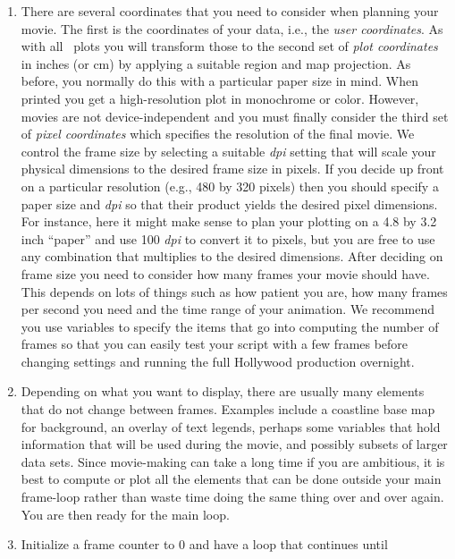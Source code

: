 \let\oldenumi\labelenumi
\renewcommand{\labelenumi}{\textbf{\arabic{enumi}.}}
\begin{enumerate}
\item There are several coordinates that you need to consider when planning
your movie.  The first is the coordinates of your data, i.e., the \emph{user
coordinates}.  As with all \GMT\ plots you will transform those to the
second set of \emph{plot coordinates} 
in inches (or cm) by applying a suitable region and map projection.  As
before, you normally do this with a particular paper size in mind.  When
printed you get a high-resolution plot in monochrome or color.
However, movies are not device-independent and you must finally consider
the third set of \emph{pixel coordinates} which specifies the resolution of the final movie.
We control the frame size by selecting a suitable \emph{dpi} setting that
will scale your physical dimensions to the desired frame size in pixels.
If you decide up front on a particular resolution (e.g., 480 by 320 pixels)
then you should specify a paper size and \emph{dpi} so that their product yields the desired pixel dimensions.
For instance, here it might make sense to plan your plotting on a 4.8 by 3.2 inch ``paper''
and use 100 \emph{dpi} to convert it to pixels, but you are free to use any combination
that multiplies to the desired dimensions.  After deciding on frame size you need
to consider how many frames your movie should have.  This depends on lots of things
such as how patient you are, how many frames per second you need and the time
range of your animation.  We recommend you use variables to specify the items that
go into computing the number of frames so that you can easily test your script
with a few frames before changing settings and running the full Hollywood production overnight.
\item Depending on what you want to display, there are usually many elements that
do not change between frames.  Examples include a coastline base map for background,
an overlay of text legends, perhaps some variables that hold information that will
be used during the movie, and possibly subsets of larger data sets.  Since movie-making
can take a long time if you are ambitious, it is best to compute or plot all the
elements that can be done outside your main frame-loop rather than waste time
doing the same thing over and over again.  You are then ready for the main loop.
\item Initialize a frame counter to 0 and have a loop that continues until

\end{enumerate}
